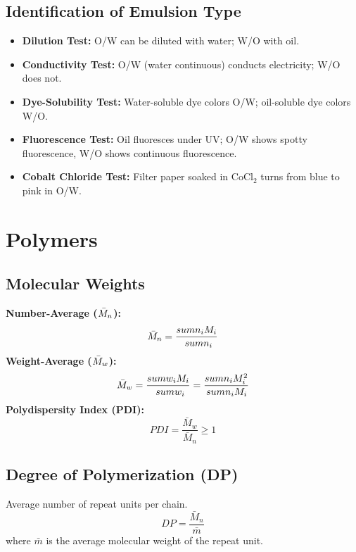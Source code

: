 \subsection{Identification of Emulsion Type}
\begin{itemize}
    \item \textbf{Dilution Test:} O/W can be diluted with water; W/O with oil.
    \item \textbf{Conductivity Test:} O/W (water continuous) conducts electricity; W/O does not.
    \item \textbf{Dye-Solubility Test:} Water-soluble dye colors O/W; oil-soluble dye colors W/O.
    \item \textbf{Fluorescence Test:} Oil fluoresces under UV; O/W shows spotty fluorescence, W/O shows continuous fluorescence.
    \item \textbf{Cobalt Chloride Test:} Filter paper soaked in $\text{CoCl}_2$ turns from blue to pink in O/W.
\end{itemize}

\section{Polymers}

\subsection{Molecular Weights}
\textbf{Number-Average ($\\\bar{M}_n$):}
\begin{equation}
    \bar{M}_n = \frac{\\sum n_i M_i}{\\sum n_i}
\end{equation}
\textbf{Weight-Average ($\\\bar{M}_w$):}
\begin{equation}
    \bar{M}_w = \frac{\\sum w_i M_i}{\\sum w_i} = \frac{\\sum n_i M_i^2}{\\sum n_i M_i}
\end{equation}
\textbf{Polydispersity Index (PDI):}
\begin{equation}
    PDI = \frac{\bar{M}_w}{\bar{M}_n} \geq 1
\end{equation}

\subsection{Degree of Polymerization (DP)}
Average number of repeat units per chain.
\begin{equation}
    DP = \frac{\bar{M}_n}{\bar{m}}
\end{equation}
where $\bar{m}$ is the average molecular weight of the repeat unit.

